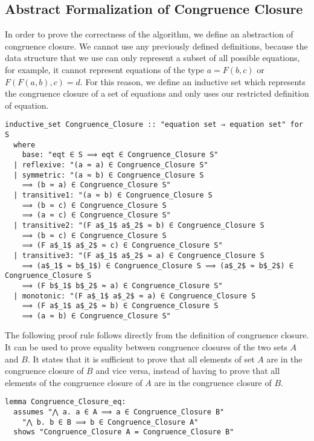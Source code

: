 \subsection{Abstract Formalization of Congruence Closure}
\label{subsection:abstraction}

In order to prove the correctness of the algorithm, we define an abstraction of congruence closure. We cannot use any previously defined definitions, because the data structure that we use can only represent a subset of all possible equations, for example, it cannot represent equations of the type $a = F(b, c)$ or $F (F (a, b), c) = d$. For this reason, we define an inductive set which represents the congruence closure of a set of equations and only uses our restricted definition of equation.

\begin{lstlisting}
inductive_set Congruence_Closure :: "equation set ⇒ equation set" for S
  where
    base: "eqt ∈ S ⟹ eqt ∈ Congruence_Closure S"
  | reflexive: "(a ≈ a) ∈ Congruence_Closure S"
  | symmetric: "(a ≈ b) ∈ Congruence_Closure S
    ⟹ (b ≈ a) ∈ Congruence_Closure S"
  | transitive1: "(a ≈ b) ∈ Congruence_Closure S
    ⟹ (b ≈ c) ∈ Congruence_Closure S
    ⟹ (a ≈ c) ∈ Congruence_Closure S"
  | transitive2: "(F a$_1$ a$_2$ ≈ b) ∈ Congruence_Closure S
    ⟹ (b ≈ c) ∈ Congruence_Closure S
    ⟹ (F a$_1$ a$_2$ ≈ c) ∈ Congruence_Closure S"
  | transitive3: "(F a$_1$ a$_2$ ≈ a) ∈ Congruence_Closure S
    ⟹ (a$_1$ ≈ b$_1$) ∈ Congruence_Closure S ⟹ (a$_2$ ≈ b$_2$) ∈ Congruence_Closure S
    ⟹ (F b$_1$ b$_2$ ≈ a) ∈ Congruence_Closure S"
  | monotonic: "(F a$_1$ a$_2$ ≈ a) ∈ Congruence_Closure S
    ⟹ (F a$_1$ a$_2$ ≈ b) ∈ Congruence_Closure S
    ⟹ (a ≈ b) ∈ Congruence_Closure S"
\end{lstlisting}

The following proof rule follows directly from the definition of congruence closure. It can be used to prove equality between congruence closures of the two sets $A$ and $B$. It states that it is sufficient to prove that all elements of set $A$ are in the congruence closure of $B$ and vice versa, instead of having to prove that all elements of the congruence closure of $A$ are in the congruence closure of $B$.

\begin{lstlisting}
lemma Congruence_Closure_eq:
  assumes "⋀ a. a ∈ A ⟹ a ∈ Congruence_Closure B"
    "⋀ b. b ∈ B ⟹ b ∈ Congruence_Closure A"
  shows "Congruence_Closure A = Congruence_Closure B"
\end{lstlisting}

